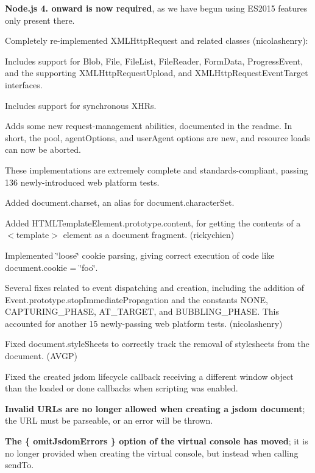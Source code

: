 \begin{DoxyItemize}
\item {\bfseries Node.\+js 4. onward is now required}, as we have begun using E\+S2015 features only present there.
\item Completely re-\/implemented {\ttfamily X\+M\+L\+Http\+Request} and related classes (nicolashenry)\+:
\begin{DoxyItemize}
\item Includes support for {\ttfamily Blob}, {\ttfamily File}, {\ttfamily File\+List}, {\ttfamily File\+Reader}, {\ttfamily Form\+Data}, {\ttfamily Progress\+Event}, and the supporting {\ttfamily X\+M\+L\+Http\+Request\+Upload}, and {\ttfamily X\+M\+L\+Http\+Request\+Event\+Target} interfaces.
\item Includes support for synchronous X\+H\+Rs.
\item Adds some new request-\/management abilities, documented in the readme. In short, the {\ttfamily pool}, {\ttfamily agent\+Options}, and {\ttfamily user\+Agent} options are new, and resource loads can now be aborted.
\item These implementations are extremely complete and standards-\/compliant, passing 136 newly-\/introduced web platform tests.
\end{DoxyItemize}
\item Added {\ttfamily document.\+charset}, an alias for {\ttfamily document.\+character\+Set}.
\item Added {\ttfamily H\+T\+M\+L\+Template\+Element.\+prototype.\+content}, for getting the contents of a {\ttfamily $<$template$>$} element as a document fragment. (rickychien)
\item Implemented \char`\"{}loose\char`\"{} cookie parsing, giving correct execution of code like {\ttfamily document.\+cookie = \char`\"{}foo\char`\"{}}.
\item Several fixes related to event dispatching and creation, including the addition of {\ttfamily Event.\+prototype.\+stop\+Immediate\+Propagation} and the constants {\ttfamily N\+O\+NE}, {\ttfamily C\+A\+P\+T\+U\+R\+I\+N\+G\+\_\+\+P\+H\+A\+SE}, {\ttfamily A\+T\+\_\+\+T\+A\+R\+G\+ET}, and {\ttfamily B\+U\+B\+B\+L\+I\+N\+G\+\_\+\+P\+H\+A\+SE}. This accounted for another 15 newly-\/passing web platform tests. (nicolashenry)
\item Fixed {\ttfamily document.\+style\+Sheets} to correctly track the removal of stylesheets from the document. (A\+V\+GP)
\item Fixed the {\ttfamily created} jsdom lifecycle callback receiving a different {\ttfamily window} object than the {\ttfamily loaded} or {\ttfamily done} callbacks when scripting was enabled.
\item {\bfseries Invalid U\+R\+Ls are no longer allowed when creating a jsdom document}; the U\+RL must be parseable, or an error will be thrown.
\item {\bfseries The {\ttfamily \{ omit\+Jsdom\+Errors \}} option of the virtual console has moved}; it is no longer provided when creating the virtual console, but instead when calling {\ttfamily send\+To}.
\end{DoxyItemize}

